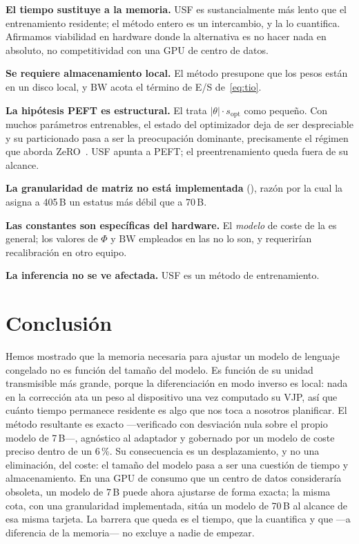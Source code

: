 \documentclass[journal]{IEEEtran}
\newcommand{\usf}{USF}
\begin{document}
\textbf{El tiempo sustituye a la memoria.} \usf{} es sustancialmente más lento que el entrenamiento
residente; el método entero es un intercambio, y la  lo cuantifica. Afirmamos
viabilidad en hardware donde la alternativa es no hacer nada en absoluto, no competitividad con una
GPU de centro de datos.

\textbf{Se requiere almacenamiento local.} El método presupone que los pesos están en un disco
local, y $\mathrm{BW}$ acota el término de E/S de~\eqref{eq:tio}.

\textbf{La hipótesis PEFT es estructural.} El  trata $|\theta|\cdot s_{\text{opt}}$
como pequeño. Con muchos parámetros entrenables, el estado del optimizador deja de ser
despreciable y su particionado pasa a ser la preocupación dominante, precisamente el régimen que
aborda ZeRO~\cite{rajbhandari2020zero}. \usf{} apunta a PEFT; el preentrenamiento queda fuera de
su alcance.

\textbf{La granularidad de matriz no está implementada} (), razón por la cual
la  asigna a 405\,B un estatus más débil que a 70\,B.

\textbf{Las constantes son específicas del hardware.} El \emph{modelo} de coste de la
 es general; los valores de $\Phi$ y $\mathrm{BW}$ empleados en las
 no lo son, y requerirían recalibración en otro equipo.

\textbf{La inferencia no se ve afectada.} \usf{} es un método de entrenamiento.

\section{Conclusión}

Hemos mostrado que la memoria necesaria para ajustar un modelo de lenguaje congelado no es función
del tamaño del modelo. Es función de su unidad transmisible más grande, porque la diferenciación en
modo inverso es local: nada en la corrección ata un peso al dispositivo una vez computado su VJP,
así que cuánto tiempo permanece residente es algo que nos toca a nosotros planificar. El método
resultante es exacto ---verificado con desviación nula sobre el propio modelo de 7\,B---, agnóstico
al adaptador y gobernado por un modelo de coste preciso dentro de un 6\,\%.
Su consecuencia es un desplazamiento, y no una eliminación, del coste: el tamaño del modelo pasa a
ser una cuestión de tiempo y almacenamiento. En una GPU de consumo que un centro de datos
consideraría obsoleta, un modelo de 7\,B puede ahora ajustarse de forma exacta; la misma cota, con
una granularidad implementada, sitúa un modelo de 70\,B al alcance de esa misma tarjeta. La barrera
que queda es el tiempo, que la  cuantifica y que ---a diferencia de la memoria---
no excluye a nadie de empezar.



\end{document}
